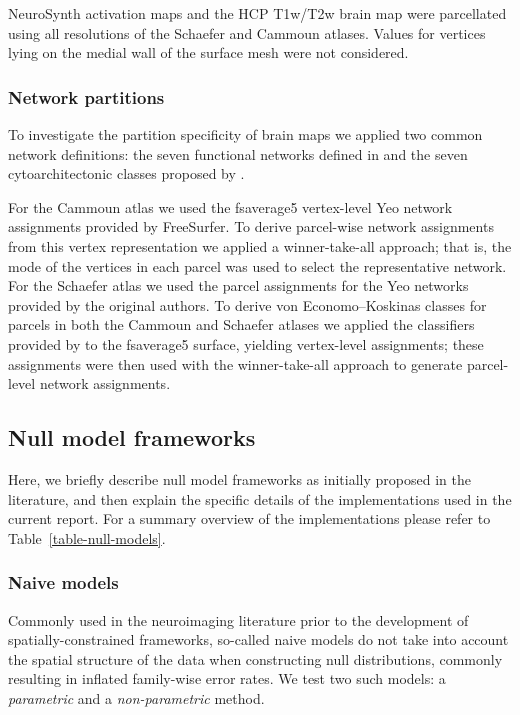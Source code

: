 \documentclass[12pt,aps,pra,reprint,showkeys]{revtex4-1}
\begin{document}
NeuroSynth activation maps and the HCP T1w/T2w brain map were parcellated using all resolutions of the Schaefer and Cammoun atlases.
Values for vertices lying on the medial wall of the surface mesh were not considered.

\subsubsection*{Network partitions}

To investigate the partition specificity of brain maps we applied two common network definitions: the seven functional networks defined in \citet{yeo2011organization} and the seven cytoarchitectonic classes proposed by \citet{voneconomo1925cytoarchitecture}.

For the Cammoun atlas we used the fsaverage5 vertex-level Yeo network assignments provided by FreeSurfer.
To derive parcel-wise network assignments from this vertex representation we applied a winner-take-all approach; that is, the mode of the vertices in each parcel was used to select the representative network.
For the Schaefer atlas we used the parcel assignments for the Yeo networks provided by the original authors.
To derive von Economo--Koskinas classes for parcels in both the Cammoun and Schaefer atlases we applied the classifiers provided by \citet{scholtens2018neuroimage} to the fsaverage5 surface, yielding vertex-level assignments; these assignments were then used with the winner-take-all approach to generate parcel-level network assignments.

\subsection*{Null model frameworks}

Here, we briefly describe null model frameworks as initially proposed in the literature, and then explain the specific details of the implementations used in the current report.
For a summary overview of the implementations please refer to Table~\ref{table-null-models}.

\subsubsection*{Naive models}

Commonly used in the neuroimaging literature prior to the development of spatially-constrained frameworks, so-called naive models do not take into account the spatial structure of the data when constructing null distributions, commonly resulting in inflated family-wise error rates.
We test two such models: a \emph{parametric} and a \emph{non-parametric} method.
\end{document}
